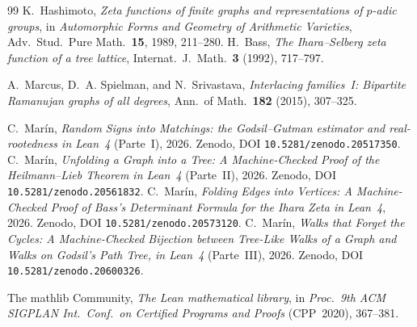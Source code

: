\documentclass[11pt]{article}
\begin{document}
\begin{thebibliography}{99}
 K.~Hashimoto, \emph{Zeta functions of finite graphs and representations of
$p$-adic groups}, in \emph{Automorphic Forms and Geometry of Arithmetic Varieties}, Adv.\ Stud.\
Pure Math.\ \textbf{15}, 1989, 211--280.
 H.~Bass, \emph{The Ihara--Selberg zeta function of a tree lattice}, Internat.\
J.~Math.\ \textbf{3} (1992), 717--797.

 A.~Marcus, D.~A. Spielman, and N.~Srivastava, \emph{Interlacing families~I: Bipartite
Ramanujan graphs of all degrees}, Ann.\ of Math.\ \textbf{182} (2015), 307--325.

 C.~Mar\'in, \emph{Random Signs into Matchings: the Godsil--Gutman estimator and
real-rootedness in Lean~4} (Parte~I), 2026. Zenodo, DOI \texttt{10.5281/zenodo.20517350}.
\bibitem{PartII} C.~Mar\'in, \emph{Unfolding a Graph into a Tree: A Machine-Checked Proof of the
Heilmann--Lieb Theorem in Lean~4} (Parte~II), 2026. Zenodo, DOI \texttt{10.5281/zenodo.20561832}.
\bibitem{Bass} C.~Mar\'in, \emph{Folding Edges into Vertices: A Machine-Checked Proof of Bass's
Determinant Formula for the Ihara Zeta in Lean~4}, 2026. Zenodo, DOI
\texttt{10.5281/zenodo.20573120}.
\bibitem{PartIII} C.~Mar\'in, \emph{Walks that Forget the Cycles: A Machine-Checked Bijection between
Tree-Like Walks of a Graph and Walks on Godsil's Path Tree, in Lean~4} (Parte~III), 2026. Zenodo, DOI
\texttt{10.5281/zenodo.20600326}.

 The mathlib Community, \emph{The Lean mathematical library}, in \emph{Proc.\ 9th
ACM SIGPLAN Int.\ Conf.\ on Certified Programs and Proofs} (CPP~2020), 367--381.

\end{thebibliography}
\end{document}
